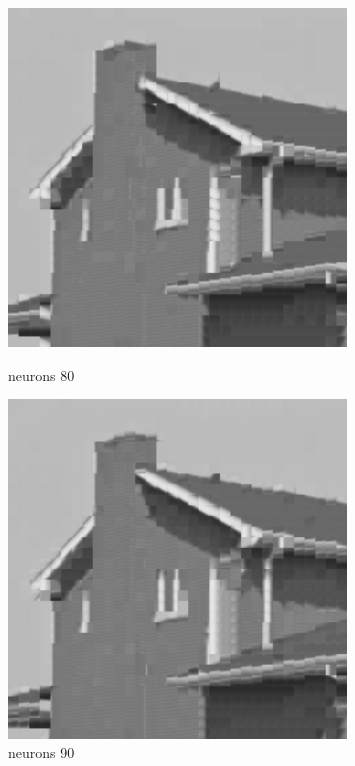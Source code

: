 \documentclass[../IDP_Task5_Karwowski_Kowalewski.tex]{subfiles}
\begin{document}
{{        \begin{figure}[!htbp]
            \begin{minipage}[c]{0.45\linewidth}
                \centering
                \includegraphics[width=0.8\textwidth]{img/kowalewski/crop_size_8_neurons_80.png}
                \caption{neurons 80}
            \end{minipage}\hfill
            \begin{minipage}[c]{0.45\linewidth}
                \centering
                \includegraphics[width=0.8\textwidth]{img/kowalewski/crop_size_8_neurons_90.png}
                \caption{neurons 90}
            \end{minipage}
        \end{figure}

}}
\end{document}
